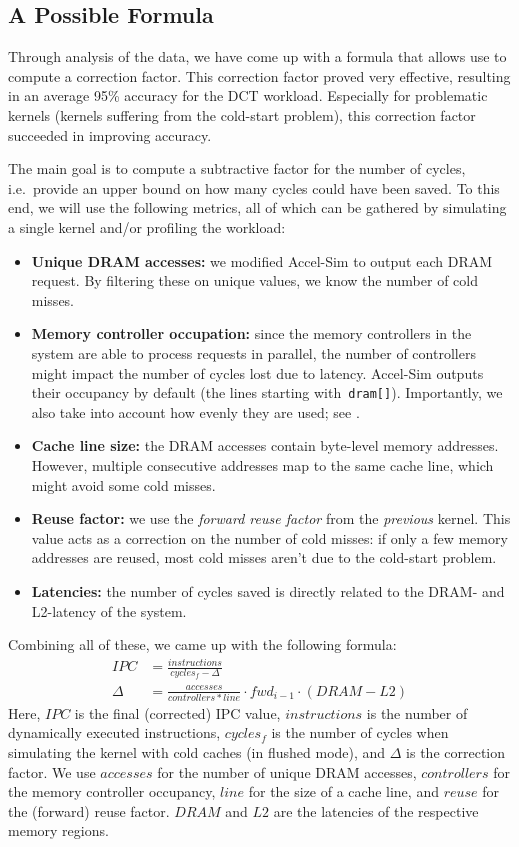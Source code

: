 \subsection{A Possible Formula}\label{subsec:formula}
Through analysis of the data, we have come up with a formula that allows use to compute a correction factor.
This correction factor proved very effective, resulting in an average 95\% accuracy for the DCT workload.
Especially for problematic kernels (kernels suffering from the cold-start problem), this correction factor succeeded in improving accuracy.

The main goal is to compute a subtractive factor for the number of cycles, i.e.\ provide an upper bound on how many cycles could have been saved.
To this end, we will use the following metrics, all of which can be gathered by simulating a single kernel and/or profiling the workload:
\begin{itemize}
    \item \textbf{Unique DRAM accesses:} we modified Accel-Sim to output each DRAM request.
    By filtering these on unique values, we know the number of cold misses.
    \item \textbf{Memory controller occupation:} since the memory controllers in the system are able to process requests in parallel, the number of controllers might impact the number of cycles lost due to latency.
    Accel-Sim outputs their occupancy by default (the lines starting with\ \verb|dram[]|).
    Importantly, we also take into account how evenly they are used; see .
    \item \textbf{Cache line size:} the DRAM accesses contain byte-level memory addresses.
    However, multiple consecutive addresses map to the same cache line, which might avoid some cold misses.
    \item \textbf{Reuse factor:} we use the \textit{forward reuse factor} from the \emph{previous} kernel.
    This value acts as a correction on the number of cold misses: if only a few memory addresses are reused, most cold misses aren't due to the cold-start problem.
    \item \textbf{Latencies:} the number of cycles saved is directly related to the DRAM- and L2-latency of the system.
\end{itemize}

Combining all of these, we came up with the following formula:
\begin{align}
    IPC &= \frac{instructions}{cycles_f - \Delta} \\
    \Delta &= \frac{accesses}{controllers * line} \cdot fwd_{i-1} \cdot (DRAM - L2)
\end{align}
Here, $IPC$ is the final (corrected) IPC value, $instructions$ is the number of dynamically executed instructions, $cycles_f$ is the number of cycles when simulating the kernel with cold caches (in flushed mode), and $\Delta$ is the correction factor.
We use $accesses$ for the number of unique DRAM accesses, $controllers$ for the memory controller occupancy, $line$ for the size of a cache line, and $reuse$ for the (forward) reuse factor.
$DRAM$ and $L2$ are the latencies of the respective memory regions.

